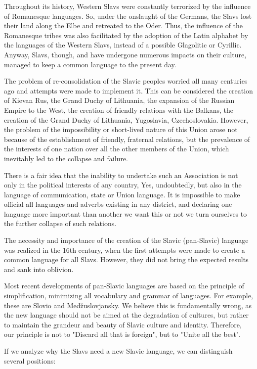 Throughout its history, Western Slavs were constantly terrorized by the influence of Romanesque languages. So, under the onslaught of the Germans, the Slavs lost their land along the Elbe and retreated to the Oder. Thus, the influence of the Romanesque tribes was also facilitated by the adoption of the Latin alphabet by the languages of the Western Slavs, instead of a possible Glagolitic or Cyrillic. Anyway, Slavs, though, and have undergone numerous impacts on their culture, managed to keep a common language to the present day.

The problem of re-consolidation of the Slavic peoples worried all many centuries ago and attempts were made to implement it. This can be considered the creation of Kievan Rus, the Grand Duchy of Lithuania, the expansion of the Russian Empire to the West, the creation of friendly relations with the Balkans, the creation of the Grand Duchy of Lithuania, Yugoslavia, Czechoslovakia. However, the problem of the impossibility or short-lived nature of this Union arose not because of the establishment of friendly, fraternal relations, but the prevalence of the interests of one nation over all the other members of the Union, which inevitably led to the collapse and failure.

There is a fair idea that the inability to undertake such an Association is not only in the political interests of any country, Yes, undoubtedly, but also in the language of communication, state or Union language. It is impossible to make official all languages and adverbs existing in any district, and declaring one language more important than another we want this or not we turn ourselves to the further collapse of such relations.

The necessity and importance of the creation of the Slavic (pan-Slavic) language was realized in the 16th century, when the first attempts were made to create a common language for all Slavs. However, they did not bring the expected results and sank into oblivion.

Most recent developments of pan-Slavic languages are based on the principle of simplification, minimizing all vocabulary and grammar of languages. For example, these are Slovio and Medžuslovjansky. We believe this is fundamentally wrong, as the new language should not be aimed at the degradation of cultures, but rather to maintain the grandeur and beauty of Slavic culture and identity. Therefore, our principle is not to "Discard all that is foreign", but to "Unite all the best".

If we analyze why the Slavs need a new Slavic language, we can distinguish several positions:


